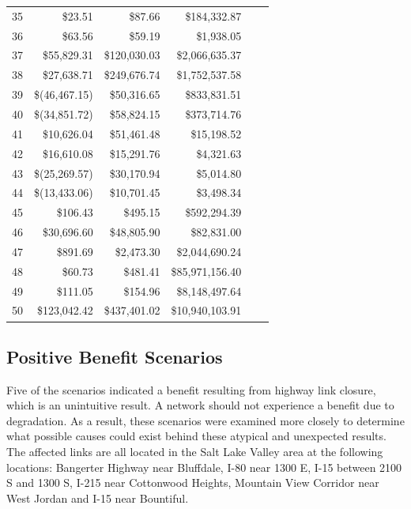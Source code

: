 \begin{table}
\begin{tabular}[t]{crrrrr}
35 & \$23.51 & \$87.66 & \$184,332.87\\
36 & \$63.56 & \$59.19 & \$1,938.05\\
37 & \$55,829.31 & \$120,030.03 & \$2,066,635.37\\
38 & \$27,638.71 & \$249,676.74 & \$1,752,537.58\\
39 & \$(46,467.15) & \$50,316.65 & \$833,831.51\\
40 & \$(34,851.72) & \$58,824.15 & \$373,714.76\\
41 & \$10,626.04 & \$51,461.48 & \$15,198.52\\
42 & \$16,610.08 & \$15,291.76 & \$4,321.63\\
43 & \$(25,269.57) & \$30,170.94 & \$5,014.80\\
44 & \$(13,433.06) & \$10,701.45 & \$3,498.34\\
45 & \$106.43 & \$495.15 & \$592,294.39\\
46 & \$30,696.60 & \$48,805.90 & \$82,831.00\\
47 & \$891.69 & \$2,473.30 & \$2,044,690.24\\
48 & \$60.73 & \$481.41 & \$85,971,156.40\\
49 & \$111.05 & \$154.96 & \$8,148,497.64\\
50 & \$123,042.42 & \$437,401.02 & \$10,940,103.91\\
\bottomrule
\end{tabular}
\end{table}


\subsection{Positive Benefit Scenarios}

Five of the scenarios indicated a benefit resulting from highway link closure,
which is an unintuitive result. A network should not experience a benefit due
to degradation. As a result, these scenarios were examined more closely to
determine what possible causes could exist behind these atypical and unexpected
results. The affected links are all located in the Salt Lake Valley area at the
following locations: Bangerter Highway near Bluffdale, I-80 near 1300 E, I-15
between 2100 S and 1300 S, I-215 near Cottonwood Heights, Mountain View
Corridor near West Jordan and I-15 near Bountiful.


